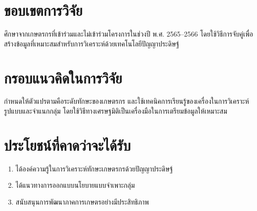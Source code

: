 \section{ขอบเขตการวิจัย}

ศึกษาจากเกษตรกรที่เข้าร่วมและไม่เข้าร่วมโครงการในช่วงปี พ.ศ. 2565–2566 โดยใช้วิธีการจับคู่เพื่อสร้างข้อมูลที่เหมาะสมสำหรับการวิเคราะห์ด้วยเทคโนโลยีปัญญาประดิษฐ์ \cite{rosenbaum1983}

\section{กรอบแนวคิดในการวิจัย}

กำหนดให้ตัวแปรตามคือระดับทักษะของเกษตรกร และใช้เทคนิคการเรียนรู้ของเครื่องในการวิเคราะห์รูปแบบและจำแนกกลุ่ม โดยใช้วิธีทางเศรษฐมิติเป็นเครื่องมือในการเตรียมข้อมูลให้เหมาะสม \cite{wooldridge2009}

\section{ประโยชน์ที่คาดว่าจะได้รับ}

\begin{enumerate}
\item ได้องค์ความรู้ในการวิเคราะห์ทักษะเกษตรกรด้วยปัญญาประดิษฐ์  
\item ได้แนวทางการออกแบบนโยบายแบบจำเพาะกลุ่ม  
\item สนับสนุนการพัฒนาภาคการเกษตรอย่างมีประสิทธิภาพ  
\end{enumerate}